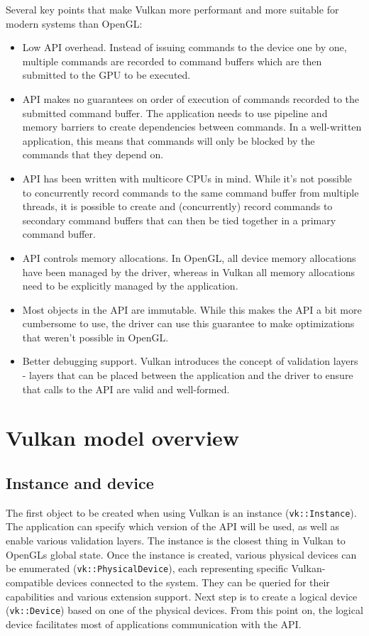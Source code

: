 \documentclass[times, utf8, zavrsni, numeric]{fer}
\begin{document}
Several key points that make Vulkan more performant and more suitable for modern systems than OpenGL:
\begin{itemize}
	\item Low API overhead. Instead of issuing commands to the device one by one, multiple commands are recorded to command buffers which are then submitted to the GPU to be executed.
	\item API makes no guarantees on order of execution of commands recorded to the submitted command buffer. The application needs to use pipeline and memory barriers to create dependencies between commands. In a well-written application, this means that commands will only be blocked by the commands that they depend on.
	\item API has been written with multicore CPUs in mind. While it's not possible to concurrently record commands to the same command buffer from multiple threads, it is possible to create and (concurrently) record commands to secondary command buffers that can then be tied together in a primary command buffer.
	\item API controls memory allocations. In OpenGL, all device memory allocations have been managed by the driver, whereas in Vulkan all memory allocations need to be explicitly managed by the application.
	\item Most objects in the API are immutable. While this makes the API a bit more cumbersome to use, the driver can use this guarantee to make optimizations that weren't possible in OpenGL.
	\item Better debugging support. Vulkan introduces the concept of validation layers - layers that can be placed between the application and the driver to ensure that calls to the API are valid and well-formed.
\end{itemize}

\section{Vulkan model overview}
\subsection{Instance and device}
The first object to be created when using Vulkan is an instance (\texttt{vk::Instance}). The application can specify which version of the API will be used, as well as enable various validation layers. The instance is the closest thing in Vulkan to OpenGLs global state. Once the instance is created, various physical devices can be enumerated (\texttt{vk::PhysicalDevice}), each representing specific Vulkan-compatible devices connected to the system. They can be queried for their capabilities and various extension support. Next step is to create a logical device (\texttt{vk::Device}) based on one of the physical devices. From this point on, the logical device facilitates most of applications communication with the API.
\end{document}
